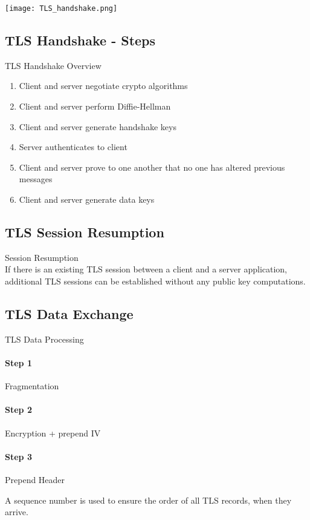 \texttt{[image: TLS\_handshake.png]}

\subsection{TLS Handshake - Steps}

\begin{concept}{TLS Handshake Overview}\\
    \begin{enumerate}
        \item Client and server negotiate crypto algorithms
        \item Client and server perform Diffie-Hellman
        \item Client and server generate handshake keys
        \item Server authenticates to client
        \item Client and server prove to one another that no one has altered previous messages
        \item Client and server generate data keys
    \end{enumerate}
\end{concept}

\subsection{TLS Session Resumption}

\begin{concept}{Session Resumption}\\
    If there is an existing TLS session between a client and a server application, additional TLS sessions can be established without any public key computations.
\end{concept}

\subsection{TLS Data Exchange}

\begin{KR}{TLS Data Processing}\\
    \paragraph{Step 1} Fragmentation
    \paragraph{Step 2} Encryption + prepend IV
    \paragraph{Step 3} Prepend Header
    
    A sequence number is used to ensure the order of all TLS records, when they arrive.
\end{KR}


